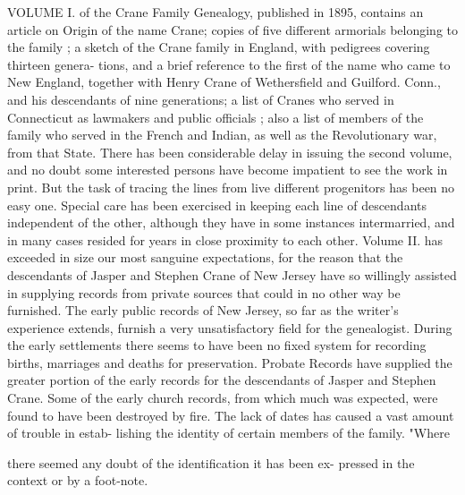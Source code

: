 \documentclass{book}
\begin{document}
VOLUME I. of the Crane Family Genealogy, published in 1895, 
contains an article on Origin of the name Crane; copies of 
five different armorials belonging to the family ; a sketch of the 
Crane family in England, with pedigrees covering thirteen genera- 
tions, and a brief reference to the first of the name who came to 
New England, together with Henry Crane of Wethersfield and 
Guilford. Conn., and his descendants of nine generations; a list 
of Cranes who served in Connecticut as lawmakers and public 
officials ; also a list of members of the family who served in the 
French and Indian, as well as the Revolutionary war, from 
that State. There has been considerable delay in issuing the 
second volume, and no doubt some interested persons have 
become impatient to see the work in print. But the task 
of tracing the lines from live different progenitors has been 
no easy one. Special care has been exercised in keeping each 
line of descendants independent of the other, although they 
have in some instances intermarried, and in many cases resided 
for years in close proximity to each other. Volume II. has 
exceeded in size our most sanguine expectations, for the 
reason that the descendants of Jasper and Stephen Crane of 
New Jersey have so willingly assisted in supplying records 
from private sources that could in no other way be furnished. 
The early public records of New Jersey, so far as the writer's 
experience extends, furnish a very unsatisfactory field for the 
genealogist. During the early settlements there seems to have 
been no fixed system for recording births, marriages and deaths 
for preservation. Probate Records have supplied the greater 
portion of the early records for the descendants of Jasper and 
Stephen Crane. Some of the early church records, from which 
much was expected, were found to have been destroyed by fire. 
The lack of dates has caused a vast amount of trouble in estab- 
lishing the identity of certain members of the family. "Where 



there seemed any doubt of the identification it has been ex- 
pressed in the context or by a foot-note. 
\end{document}
